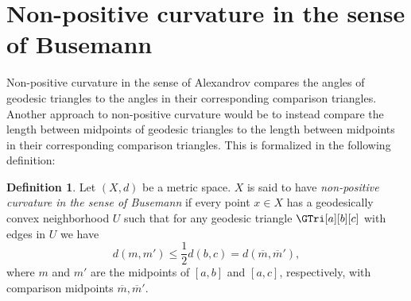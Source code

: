 \documentclass[11pt, a4paper, oneside]{memoir}
\theoremstyle{plain}\newtheorem{theorem}[subsection]{Theorem}
\theoremstyle{definition}
\newtheorem{definition}[subsection]{Definition}
\begin{document}
\section{Non-positive curvature in the sense of Busemann}
Non-positive curvature in the sense of Alexandrov compares the angles of geodesic triangles to the angles in their corresponding comparison triangles.
Another approach to non-positive curvature would be to instead compare the length between midpoints of geodesic triangles to the length between midpoints in their corresponding comparison triangles.
This is formalized in the following definition:
\begin{definition}\label{def:neg_buse}
Let \((X,d)\) be a metric space.
\(X\) is said to have \textit{non-positive curvature in the sense of Busemann} if every point \(x\in X\) has a geodesically convex neighborhood \(U\) such that for any geodesic triangle \(\GTri[a][b][c]\) with edges in \(U\) we have 
\[d(m,m')\leq\frac{1}{2}d(b,c)=d(\overline{m},\overline{m}'),\]
where \(m\) and \(m'\) are the midpoints of \([a,b]\) and \([a,c]\), respectively, with comparison midpoints \(\overline{m},\overline{m}'\).
\end{definition}
\end{document}
